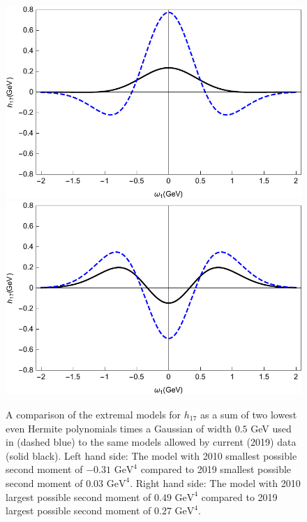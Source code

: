 \begin{figure}
\begin{center}
\includegraphics[scale=0.6]{FigureMoment2Low.pdf}
\hspace{1cm}
\includegraphics[scale=0.6]{FigureMoment2High.pdf}
\caption{\label{fig1} A comparison of the extremal models for $h_{17}$ as a sum of two lowest even Hermite polynomials times a Gaussian of width $0.5$ GeV used in \cite{Benzke:2010js} (dashed blue) to the same models allowed by current (2019) data (solid black). Left hand side:  The model with 2010 smallest possible second moment of $-0.31\mbox{ GeV}^4$ compared to 2019 smallest possible second moment of $0.03\mbox{ GeV}^4$. Right hand side:  The model with 2010 largest possible second moment of $0.49\mbox{ GeV}^4$ compared to 2019 largest possible second moment of $0.27\mbox{ GeV}^4$. 
}
\end{center}
\end{figure}
